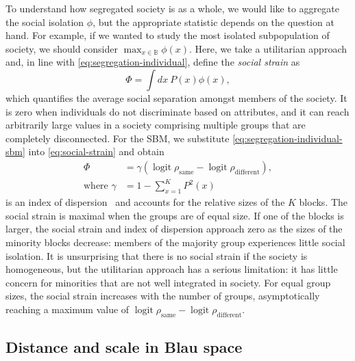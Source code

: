 \documentclass{scrartcl}
\DeclareMathOperator{\logit}{logit}
\newcommand{\blauspace}{\mathbb{B}}
\begin{document}
To understand how segregated society is as a whole, we would like to aggregate the social isolation $\phi$, but the appropriate statistic depends on the question at hand. For example, if we wanted to study the most isolated subpopulation of society, we should consider $\max_{x\in\blauspace}\phi(x)$. Here, we take a utilitarian approach and, in line with \cref{eq:segregation-individual}, define the \emph{social strain} as
\begin{equation}
    \Phi = \int dx\ P(x) \phi(x),\label{eq:social-strain}
\end{equation}
which quantifies the average social separation amongst members of the society. It is zero when individuals do not discriminate based on attributes, and it can reach arbitrarily large values in a society comprising multiple groups that are completely disconnected. For the SBM, we substitute \cref{eq:segregation-individual-sbm} into \cref{eq:social-strain} and obtain
\begin{align}
    \Phi&= \gamma\left(\logit\rho_\mathrm{same}-\logit\rho_\mathrm{different}\right),\nonumber \\
    \text{where }\gamma&=1 - \sum_{x=1}^K P^2(x) \label{eq:segregation-distributional-factor}
\end{align}
is an index of dispersion~\cite{Moody2001} and accounts for the relative sizes of the $K$ blocks. The social strain is maximal when the groups are of equal size. If one of the blocks is larger, the social strain and index of dispersion approach zero as the sizes of the minority blocks decrease: members of the majority group experiences little social isolation. It is unsurprising that there is no social strain if the society is homogeneous, but the utilitarian approach has a serious limitation: it has little concern for minorities that are not well integrated in society. For equal group sizes, the social strain increases with the number of groups, asymptotically reaching a maximum value of $\logit\rho_\mathrm{same}-\logit\rho_\mathrm{different}$.

\subsection{Distance and scale in Blau space\label{sec:segregation-distance}}
\end{document}
